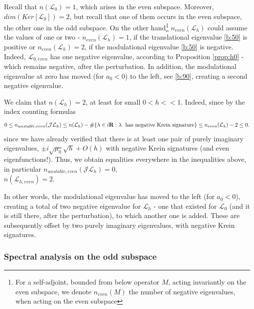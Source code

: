 \documentclass[12pt]{amsart}
\theoremstyle{definition}
\theoremstyle{remark}
\numberwithin{equation}{section}
\renewcommand{\(}{\left(}
\renewcommand{\)}{\right)}
\renewcommand{\[}{\left[}
\renewcommand{\]}{\right]}
\newcommand{\cl}{{\mathcal L}}
\newcommand{\la}{\lambda}
\newcommand{\rone}{\mathbf R}
\newcommand{\cj}{{\mathcal J}}
\begin{document}
  Recall that $n(\cl_0)=1$, which arises in the even subspace.  Moreover, $dim(Ker[\cl_0])=2$, but recall that one of them occurs in the even subspace, the other one in the odd subspace. On the other hand\footnote{For a self-adjoint, bounded from below operator $M$, acting invariantly on the even subspace, we denote $n_{even}(M)$ the number of negative eigenvalues, when acting on the even subspace}
  $n_{even}(\cl_h)$ could assume the values of
 one  or two - $n_{even}(\cl_h)=1$,   if the translational eigenvalue \eqref{b:50} is positive or  $n_{even}(\cl_h)=2$, if the   modulational eigenvalue \eqref{b:50} is negative. Indeed, $\cl_{0, even}$ has one negative eigenvalue, according to Proposition \ref{prop:h0} - which remains negative, after the perturbation. In addition, the modulational eigenvalue at zero has moved (for $a_0<0$) to the left, see \eqref{b:90}, creating a second negative eigenvalue.

  We claim that
 $n(\cl_h)=2$, at least for small $0<h<<1$.  Indeed, since by the index counting formulas
 $$
   0\leq n_{unstable, even}(\cj \cl_h)\leq n(\cl_h)-\# \{\la\in i \rone: \la \ \ \textup{has negative Krein signature}  \}\leq
 n_{even}(\cl_h)-2\leq 0.
  $$
since we have already verified that there is at least one  pair of purely imaginary eigenvalues, $\pm i \sqrt{\mu_0} \sqrt{h} +O(h)$  with negative Krein signatures (and even eigenfunctions!). Thus, we obtain equalities everywhere in the inequalities above, in particular $n_{unstable, even }(\cj \cl_h)=0$, \\ $n(\cl_{h, even})=2$.


In other words,      the  modulational  eigenvalue has moved to the left (for $a_0<0$), creating  a total of
two negative eigenvalue for $\cl_h$  - one that existed for $\cl_0$ (and it is still there, after the perturbation), to which another one is added.  These  are subsequently offset by two purely imaginary eigenvalues, with negative Krein signatures.


\subsubsection{Spectral analysis on the odd subspace}
\end{document}
